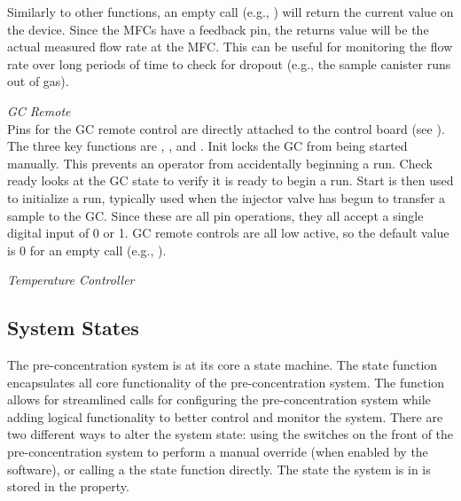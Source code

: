 Similarly to other functions, an empty call (e.g., ) will return the current value on the device. Since the MFCs have a feedback pin, the returns value will be the actual measured flow rate at the MFC. This can be useful for monitoring the flow rate over long periods of time to check for dropout (e.g., the sample canister runs out of gas).

\emph{GC Remote}\\
Pins for the GC remote control are directly attached to the control board (see ). The three key functions are , , and . Init locks the GC from being started manually. This prevents an operator from accidentally beginning a run. Check ready looks at the GC state to verify it is ready to begin a run. Start is then used to initialize a run, typically used when the injector valve has begun to transfer a sample to the GC. Since these are all pin operations, they all accept a single digital input of 0 or 1. GC remote controls are all low active, so the default value is 0 for an empty call (e.g., ).

\emph{Temperature Controller}

\subsection{System States}
The pre-concentration system is at its core a state machine. The state function encapsulates all core functionality of the pre-concentration system. The  function allows for streamlined calls for configuring the pre-concentration system while adding logical functionality to better control and monitor the system. There are two different ways to alter the system state: using the switches on the front of the pre-concentration system to perform a manual override (when enabled by the software), or calling a the state function directly. The state the system is in is stored in the  property.

